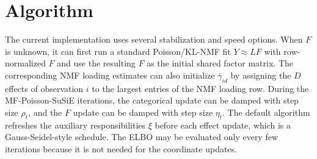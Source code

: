 \documentclass[11pt]{article}
\newcommand{\gb}{\bar{\gamma}}
\theoremstyle{definition}
\begin{document}
\section{Algorithm}

The current implementation uses several stabilization and speed options. When
$F$ is unknown, it can first run a standard Poisson/KL-NMF fit
$Y \approx LF$ with row-normalized $F$ and use the resulting $F$ as the initial
shared factor matrix. The corresponding NMF loading estimates can also
initialize $\gb_{id}$ by assigning the $D$ effects of observation $i$ to the
largest entries of the NMF loading row. During the MF-Poisson-SuSiE iterations,
the categorical update can be damped with step size $\rho_t$, and the $F$ update
can be damped with step size $\eta_t$. The default algorithm refreshes the
auxiliary responsibilities $\xi$ before each effect update, which is a
Gauss-Seidel-style schedule. The ELBO may be evaluated only every few
iterations because it is not needed for the coordinate updates.
\end{document}

